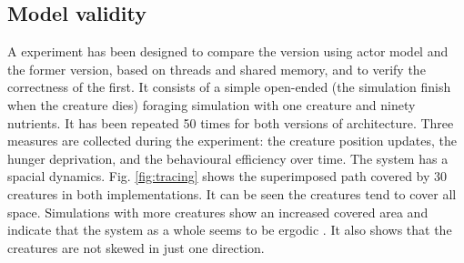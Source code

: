 \documentclass[runningheads]{llncs}
\begin{document}
\subsection{Model validity}
A experiment has been designed  to compare the version using actor model and the former version, based on threads and shared memory, and to verify the correctness of the first. It consists of a simple open-ended (the simulation finish when the creature dies) foraging simulation with one creature and ninety nutrients. It has been repeated 50 times for both versions of architecture. 
Three measures are collected during the experiment:  the creature position updates, the hunger deprivation, and the behavioural efficiency over time.
The system has a spacial dynamics. Fig. \ref{fig:tracing} shows the superimposed path covered by 30 creatures in both implementations. It can be seen the creatures tend to cover all space. Simulations with more creatures show an increased covered area and indicate that the system as a whole seems to be ergodic \cite{Cornfeld2012}. It also shows that the creatures are not skewed in just one direction.
\end{document}
